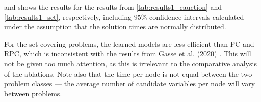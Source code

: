  and  shows the results for the results from \cref{tab:results1_cauction} and \cref{tab:results1_set}, respectively, including $95 \%$ confidence intervals calculated under the assumption that the solution times are normally distributed.

For the set covering problems, the learned models are less efficient than \gls{PC} and \gls{RPC}, which is inconsistent with the results from Gasse et al. (2020) \cite{gasse2019exact}. This will not be given too much attention, as this is irrelevant to the comparative analysis of the ablations.
Note also that the time per node is not equal between the two problem classes --- the average number of candidate variables per node will vary between problems.  

